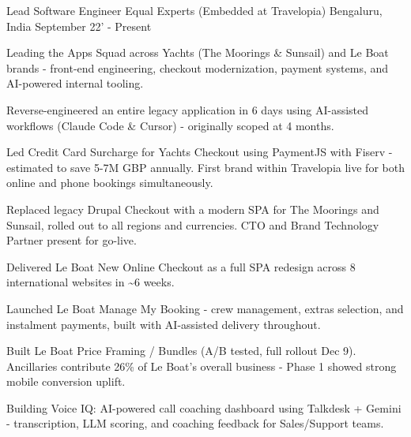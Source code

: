 

\begin{cventries}

  \cventry
    {Lead Software Engineer} %
    {Equal Experts (Embedded at Travelopia)} %
    {Bengaluru, India} %
    {September 22' - Present} %
    {
		\begin{cvitems} %
			\item {Leading the Apps Squad across Yachts (The Moorings \& Sunsail) and Le Boat brands - front-end engineering, checkout modernization, payment systems, and AI-powered internal tooling.}
			\item {Reverse-engineered an entire legacy application in 6 days using AI-assisted workflows (Claude Code \& Cursor) - originally scoped at 4 months.}
			\item {Led Credit Card Surcharge for Yachts Checkout using PaymentJS with Fiserv - estimated to save 5-7M GBP annually. First brand within Travelopia live for both online and phone bookings simultaneously.}
			\item {Replaced legacy Drupal Checkout with a modern SPA for The Moorings and Sunsail, rolled out to all regions and currencies. CTO and Brand Technology Partner present for go-live.}
			\item {Delivered Le Boat New Online Checkout as a full SPA redesign across 8 international websites in \textasciitilde{}6 weeks.}
			\item {Launched Le Boat Manage My Booking - crew management, extras selection, and instalment payments, built with AI-assisted delivery throughout.}
			\item {Built Le Boat Price Framing / Bundles (A/B tested, full rollout Dec 9). Ancillaries contribute 26\% of Le Boat's overall business - Phase 1 showed strong mobile conversion uplift.}
			\item {Building Voice IQ: AI-powered call coaching dashboard using Talkdesk + Gemini - transcription, LLM scoring, and coaching feedback for Sales/Support teams.}
		\end{cvitems}
    }


\end{cventries}
